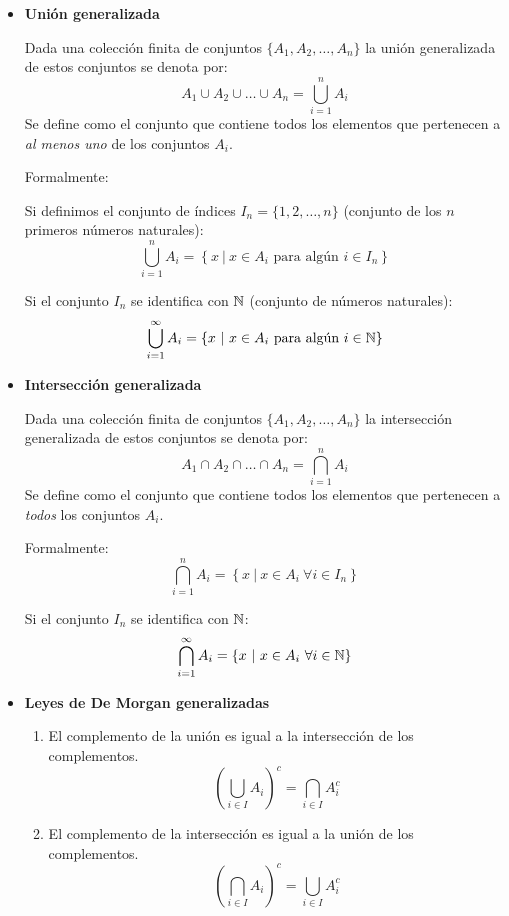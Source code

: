 \begin{itemize}
	\item \textbf{Unión generalizada} 
	
	Dada una colección finita de conjuntos \( \{ A_1, A_2, \dots, A_n \} \) la unión generalizada de estos conjuntos se denota por:
	\[ A_1 \cup A_2 \cup \dots \cup A_n = \bigcup_{i=1}^n A_i  \]
	Se define como el conjunto que contiene todos los elementos que pertenecen a \textit{al menos uno} de los conjuntos \(A_i\).
	
	Formalmente:
	
	Si definimos el conjunto de índices \( I_n = \{ 1, 2, \dots, n \} \) (conjunto de los $n$ primeros números naturales):
	\[ \bigcup_{i=1}^n A_i = \left\{ x \ | \ x \in A_i \mbox{ para algún } i \in I_n \right\} \]
	
	Si el conjunto $I_n$ se identifica con $\mathbb{N}$ (conjunto de números naturales):
	\[ \bigcup_{i=1}^\infty A_i = \left\{ x \ | \ x \in A_i \mbox{ para algún } i \in \mathbb{N} \right\} \]
	
	\item \textbf{Intersección generalizada} 
	
	Dada una colección finita de conjuntos \( \{ A_1, A_2, \dots, A_n \} \) la intersección generalizada de estos conjuntos se denota por:
	\[ A_1 \cap A_2 \cap \dots \cap A_n = \bigcap_{i=1}^n A_i  \]
	Se define como el conjunto que contiene todos los elementos que pertenecen a \textit{todos} los conjuntos \(A_i\).
	
	Formalmente:
	\[ \bigcap_{i=1}^n A_i = \left\{ x \ | \ x \in A_i \ \forall i \in I_n \right\} \]
	
	Si el conjunto $I_n$ se identifica con $\mathbb{N}$:
	\[ \bigcap_{i=1}^\infty A_i = \left\{ x \ | \ x \in A_i \ \forall i \in \mathbb{N} \right\} \]
	
	\item \textbf{Leyes de De Morgan generalizadas}
	
	\begin{enumerate}
		\item El complemento de la unión es igual a la intersección de los complementos. 
		\[ \left( \bigcup_{i \in I} A_i \right)^c = \bigcap_{i\in I} A_i^c \]
		\item El complemento de la intersección es igual a la unión de los complementos.
		\[ \left( \bigcap_{i \in I} A_i \right)^c = \bigcup_{i\in I} A_i^c \]
	\end{enumerate}
\end{itemize}


